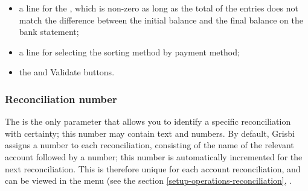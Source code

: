 \begin{itemize}
\begin{itemize}
		\item the , which is the sum of the pointed operations;
	\end{itemize}
	\item a line for the , which is non-zero as long as the total of the entries does not match the difference between the initial balance and the final balance on the bank statement;
	\item a line for selecting the \gls{sorting} method by payment method;
	\item the  and {Validate} buttons.
\end{itemize}


\subsubsection{Reconciliation number\label{reconciliation-account-description-number}}

The  is the only parameter that allows you to identify a specific reconciliation with certainty; this number may contain text and numbers. By default, Grisbi assigns a number to each reconciliation, consisting of the name of the relevant account followed by a number; this number is automatically incremented for the next reconciliation. This  is therefore unique for each account reconciliation, and can be viewed in the  menu (see the section \vref{setup-operations-reconciliation}, .

